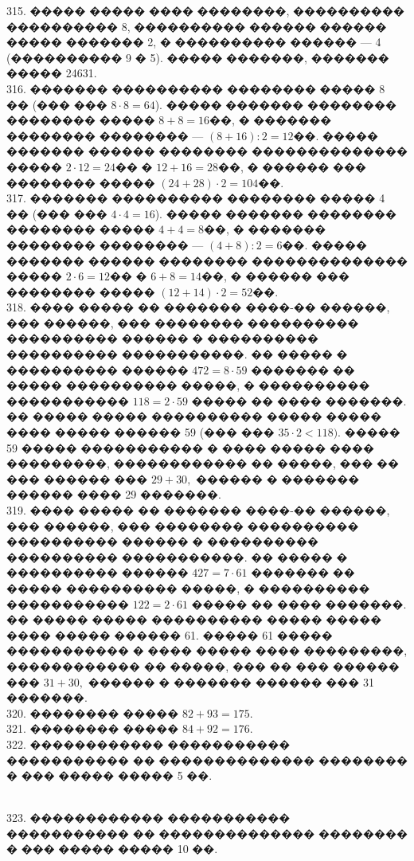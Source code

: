 \documentclass[12pt]{article}
\begin{document}
315. ����� ����� ���� ��������, ���������� ���������� 8, ���������� ������ ������ ����� ������� 2, � ���������� ������ --- 4 (���������� 9 � 5). ����� �������, ������� ����� 24631.\\
316. ������� ���������� �������� ����� 8 �� (��� ��� $8\cdot8=64$). ����� ������� �������� �������� ����� $8+8=16$��, � ������� �������� �������� --- $(8+16):2=12$��. ����� ������� ������ �������� �������������� ����� $2\cdot12=24$�� � $12+16=28$��, � ������ ��� �������� ����� $(24+28)\cdot2=104$��.\\
317. ������� ���������� �������� ����� 4 �� (��� ��� $4\cdot4=16$). ����� ������� �������� �������� ����� $4+4=8$��, � ������� �������� �������� --- $(4+8):2=6$��. ����� ������� ������ �������� �������������� ����� $2\cdot6=12$�� � $6+8=14$��, � ������ ��� �������� ����� $(12+14)\cdot2=52$��.\\
318. ���� ����� �� ������� ����-�� ������, ��� ������, ��� �������� ���������� ���������� ������ � ���������� ���������� �����������. �� ����� � ���������� ������ $472=8\cdot59$ ������� �� ����� ���������� �����, � ���������� ����������� $118=2\cdot59$ ����� �� ���� �������. �� ����� ����� ���������� ����� ����� ���� ����� ������ 59 (��� ��� $35\cdot2<118).$ ����� 59 ����� ����������� � ���� ����� ���� ���������, ������������ �� �����, ��� �� ��� ������ ��� $29+30,$ ������ � ������� ������ ���� 29 �������.\\
319. ���� ����� �� ������� ����-�� ������, ��� ������, ��� �������� ���������� ���������� ������ � ���������� ���������� �����������. �� ����� � ���������� ������ $427=7\cdot61$ ������� �� ����� ���������� �����, � ���������� ����������� $122=2\cdot61$ ����� �� ���� �������. �� ����� ����� ���������� ����� ����� ���� ����� ������ 61.  ����� 61 ����� ����������� � ���� ����� ���� ���������, ������������ �� �����, ��� �� ��� ������ ��� $31+30,$ ������ � ������� ������ ��� 31 �������.\\
320. �������� ����� $82+93=175.$\\
321. �������� ����� $84+92=176.$\\
322. ������������ ����������� ����������� �� �������������� �������� � ��� ����� ����� 5 ��.\\
\begin{figure}[ht!]
\end{figure}\\
323. ������������ ����������� ����������� �� �������������� �������� � ��� ����� ����� 10 ��.\\
\end{document}
